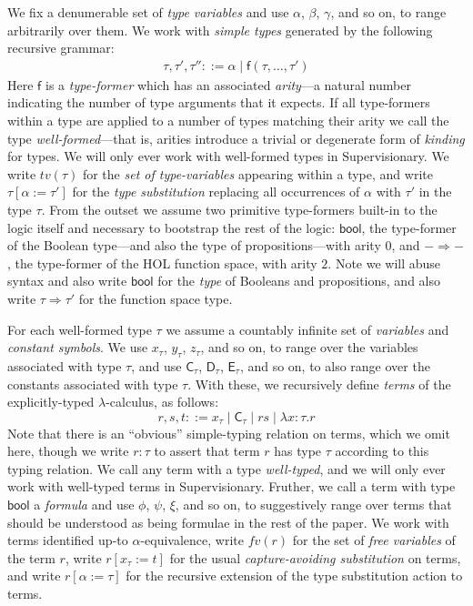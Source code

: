 \documentclass[a4paper, UKenglish, cleveref, autoref, thm-restate, colorlinks]{lipics-v2021}
\newcommand{\lam}[1]{\lambda{#1}.}
\begin{document}
We fix a denumerable set of \emph{type variables} and use $\alpha$, $\beta$, $\gamma$, and so on, to range arbitrarily over them.
We work with \emph{simple types} generated by the following recursive grammar:
\begin{gather*}
\tau, \tau', \tau'' ::= \alpha \mid \mathsf{f}(\tau, \ldots, \tau')
\end{gather*}
Here $\mathsf{f}$ is a \emph{type-former} which has an associated \emph{arity}---a natural number indicating the number of type arguments that it expects.
If all type-formers within a type are applied to a number of types matching their arity we call the type \emph{well-formed}---that is, arities introduce a trivial or degenerate form of \emph{kinding} for types.
We will only ever work with well-formed types in Supervisionary.
We write $tv(\tau)$ for the \emph{set of type-variables} appearing within a type, and write $\tau[\alpha := \tau']$ for the \emph{type substitution} replacing all occurrences of $\alpha$ with $\tau'$ in the type $\tau$.
From the outset we assume two primitive type-formers built-in to the logic itself and necessary to bootstrap the rest of the logic: $\mathsf{bool}$, the type-former of the Boolean type---and also the type of propositions---with arity $0$, and $- \Rightarrow -$, the type-former of the HOL function space, with arity $2$.
Note we will abuse syntax and also write $\mathsf{bool}$ for the \emph{type} of Booleans and propositions, and also write $\tau \Rightarrow \tau'$ for the function space type.

For each well-formed type $\tau$ we assume a countably infinite set of \emph{variables} and \emph{constant symbols}.
We use $x_\tau$, $y_\tau$, $z_\tau$, and so on, to range over the variables associated with type $\tau$, and use $\mathsf{C}_\tau$, $\mathsf{D}_\tau$, $\mathsf{E}_\tau$, and so on, to also range over the constants associated with type $\tau$.
With these, we recursively define \emph{terms} of the explicitly-typed $\lambda$-calculus, as follows:
\begin{displaymath}
r, s, t ::= x_\tau \mid \mathsf{C}_\tau \mid rs \mid \lam{x{:}\tau}r
\end{displaymath}
Note that there is an ``obvious'' simple-typing relation on terms, which we omit here, though we write $r : \tau$ to assert that term $r$ has type $\tau$ according to this typing relation.
We call any term with a type \emph{well-typed}, and we will only ever work with well-typed terms in Supervisionary.
Fruther, we call a term with type $\mathsf{bool}$ a \emph{formula} and use $\phi$, $\psi$, $\xi$, and so on, to suggestively range over terms that should be understood as being formulae in the rest of the paper.
We work with terms identified up-to $\alpha$-equivalence, write $fv(r)$ for the set of \emph{free variables} of the term $r$, write $r[x_\tau := t]$ for the usual \emph{capture-avoiding substitution} on terms, and write $r[\alpha := \tau]$ for the recursive extension of the type substitution action to terms.
\end{document}
